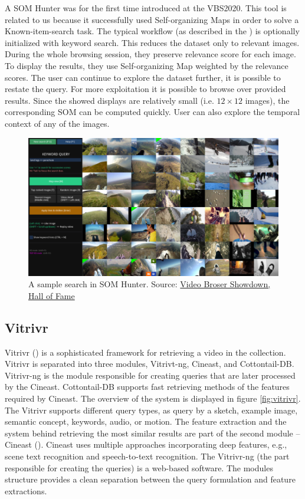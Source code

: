 A SOM Hunter was for the first time introduced at the VBS2020. This tool is related to us because it successfully used Self-organizing Maps in order to solve a Known-item-search task. The typical workflow (as described in the \cite{kratochvil2020som}) is optionally initialized with keyword search. This reduces the dataset only to relevant images. During the whole browsing session, they preserve relevance score for each image. To display the results, they use Self-organizing Map weighted by the relevance scores. The user can continue to explore the dataset further, it is possible to restate the query. For more exploitation it is possible to browse over provided results. Since the showed displays are relatively small (i.e. $12\times12$ images), the corresponding SOM can be computed quickly. User can also explore the temporal context of any of the images.


\begin{figure}
    \centering
    \includegraphics[width=0.99\linewidth]{img/som_hunter_small.png}
    \caption{A sample search in SOM Hunter. Source: \href{https://videobrowsershowdown.org/hall-of-fame/}{Video Broser Showdown, Hall of Fame}}
    \label{fig:som_hunter}
\end{figure}

\subsection{Vitrivr}

Vitrivr (\cite{rossetto2016vitrivr}) is a sophisticated framework for retrieving a video in the collection. Vitrivr is separated into three modules, Vitrivt-ng, Cineast, and Cottontail-DB.  Vitrivr-ng is the module responsible for creating queries that are later processed by the Cineast. Cottontail-DB supports fast retrieving methods of the features required by Cineast. The overview of the system is displayed in figure \ref{fig:vitrivr}. The Vitrivr supports different query types, as query by a sketch, example image, semantic concept, keywords, audio, or motion. The feature extraction and the system behind retrieving the most similar results are part of the second module -- Cineast (\cite{rossetto2016searching}). Cineast uses multiple approaches incorporating deep features, e.g., scene text recognition and speech-to-text recognition. The Vitrivr-ng (the part responsible for creating the queries) is a web-based software. The modules structure provides a clean separation between the query formulation and feature extractions.

